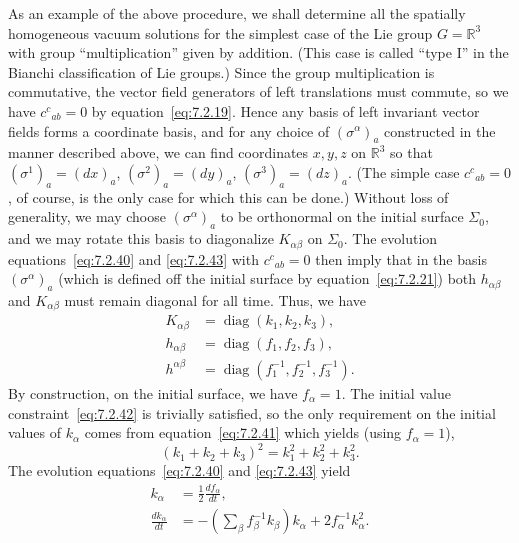 As an example of the above procedure, we shall determine all the spatially
homogeneous vacuum solutions for the simplest case of the Lie group
\(G=\mathbb R^3\) with group “multiplication” given by addition. (This case is
called “type I” in the Bianchi classification of Lie groups.) Since the group
multiplication is commutative, the vector field generators of left translations must
commute, so we have \(c^c{}_{ab}=0\) by equation~\eqref{eq:7.2.19}. Hence any
basis of left invariant vector fields forms a coordinate basis, and for any choice of
\((\sigma^\alpha)_a\) constructed in the manner described above, we can find
coordinates \(x,y,z\) on \(\mathbb R^3\) so that
\((\sigma^1)_a=(dx)_a\), \((\sigma^2)_a=(dy)_a\),
\((\sigma^3)_a=(dz)_a\). (The simple case \(c^c{}_{ab}=0\), of course, is the
only case for which this can be done.) Without loss of generality, we may choose
\((\sigma^\alpha)_a\) to be orthonormal on the initial surface \(\Sigma_0\), and
we may rotate this basis to diagonalize \(K_{\alpha\beta}\) on \(\Sigma_0\). The
evolution equations~\eqref{eq:7.2.40} and \eqref{eq:7.2.43} with
\(c^c{}_{ab}=0\) then imply that in the basis \((\sigma^\alpha)_a\) (which is
defined off the initial surface by equation~\eqref{eq:7.2.21}) both
\(h_{\alpha\beta}\) and \(K_{\alpha\beta}\) must remain diagonal for all time.
Thus, we have
\begin{align}
  K_{\alpha\beta}&=\operatorname{diag}(k_1,k_2,k_3) ,
  \tag{7.2.44}\label{eq:7.2.44}\\
  h_{\alpha\beta}&=\operatorname{diag}(f_1,f_2,f_3) ,
  \tag{7.2.45}\label{eq:7.2.45}\\
  h^{\alpha\beta}&=\operatorname{diag}(f_1^{-1},f_2^{-1},f_3^{-1}) .
  \tag{7.2.46}\label{eq:7.2.46}
\end{align}
By construction, on the initial surface, we have \(f_\alpha=1\). The initial value
constraint~\eqref{eq:7.2.42} is trivially satisfied, so the only requirement on the
initial values of \(k_\alpha\) comes from equation~\eqref{eq:7.2.41} which yields
(using \(f_\alpha=1\)),
\begin{equation}
  (k_1+k_2+k_3)^2=k_1^2+k_2^2+k_3^2 .
  \tag{7.2.47}\label{eq:7.2.47}
\end{equation}
The evolution equations~\eqref{eq:7.2.40} and \eqref{eq:7.2.43} yield
\begin{align}
  k_\alpha&=\frac12\frac{df_\alpha}{dt} ,
  \tag{7.2.48}\label{eq:7.2.48}\\
  \frac{dk_\alpha}{dt}
    &=-\left(\sum_\beta f_\beta^{-1}k_\beta\right)k_\alpha
      +2f_\alpha^{-1}k_\alpha^2 .
  \tag{7.2.49}\label{eq:7.2.49}
\end{align}
